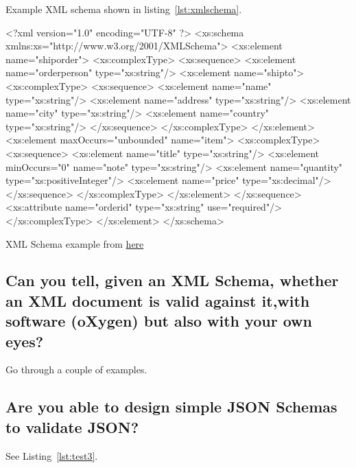 \documentclass{article}
\begin{document}
Example XML schema shown in listing~\ref{lst:xmlschema}.


\begin{center}
\begin{listing}[!ht]
  \begin{xml}
  <?xml version="1.0" encoding="UTF-8" ?>
  <xs:schema xmlns:xs="http://www.w3.org/2001/XMLSchema">
    <xs:element name="shiporder">
      <xs:complexType>
        <xs:sequence>
          <xs:element name="orderperson" type="xs:string"/>
          <xs:element name="shipto">
            <xs:complexType>
              <xs:sequence>
                <xs:element name="name" type="xs:string"/>
                <xs:element name="address" type="xs:string"/>
                <xs:element name="city" type="xs:string"/>
                <xs:element name="country" type="xs:string"/>
              </xs:sequence>
            </xs:complexType>
          </xs:element>
          <xs:element maxOccurs="unbounded" name="item">
            <xs:complexType>
              <xs:sequence>
                <xs:element name="title" type="xs:string"/>
                <xs:element minOccurs="0" name="note" type="xs:string"/>
                <xs:element name="quantity" type="xs:positiveInteger"/>
                <xs:element name="price" type="xs:decimal"/>
              </xs:sequence>
            </xs:complexType>
          </xs:element>
        </xs:sequence>
        <xs:attribute name="orderid" type="xs:string" use="required"/>
      </xs:complexType>
    </xs:element>
  </xs:schema>
  \end{xml}
  \caption[Test]{XML Schema example from \href{https://www.w3schools.com/xml/schema_example.asp}{here}}
  \label{lst:xmlschema}
\end{listing}
\end{center}

\subsection{Can you tell, given an XML Schema, whether an XML document is valid against it,with software (oXygen) but also with your own eyes?}

Go through a couple of examples.

\subsection{Are you able to design simple JSON Schemas to validate JSON?}

See Listing~\ref{lst:test3}.
\end{document}
